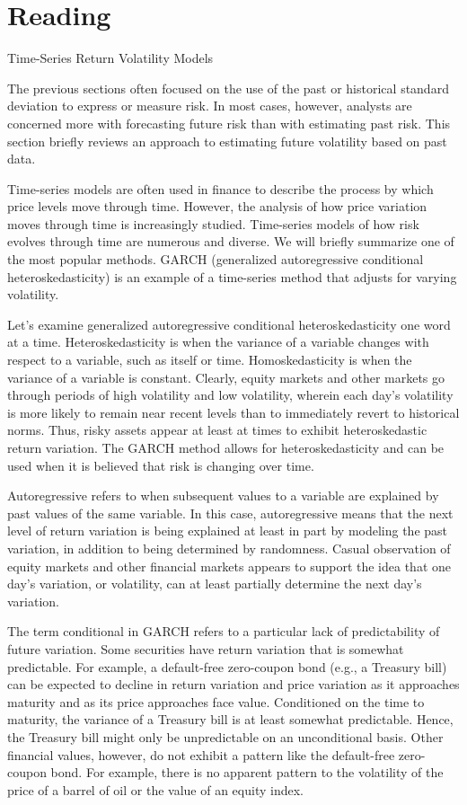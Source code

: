 \documentclass[11pt]{article}
\begin{document}
\section*{Reading}
Time-Series Return Volatility Models

The previous sections often focused on the use of the past or historical standard deviation to express or measure risk. In most cases, however, analysts are concerned more with forecasting future risk than with estimating past risk. This section briefly reviews an approach to estimating future volatility based on past data.

Time-series models are often used in finance to describe the process by which price levels move through time. However, the analysis of how price variation moves through time is increasingly studied. Time-series models of how risk evolves through time are numerous and diverse. We will briefly summarize one of the most popular methods. GARCH (generalized autoregressive conditional heteroskedasticity) is an example of a time-series method that adjusts for varying volatility.

Let's examine generalized autoregressive conditional heteroskedasticity one word at a time. Heteroskedasticity is when the variance of a variable changes with respect to a variable, such as itself or time. Homoskedasticity is when the variance of a variable is constant. Clearly, equity markets and other markets go through periods of high volatility and low volatility, wherein each day's volatility is more likely to remain near recent levels than to immediately revert to historical norms. Thus, risky assets appear at least at times to exhibit heteroskedastic return variation. The GARCH method allows for heteroskedasticity and can be used when it is believed that risk is changing over time.

Autoregressive refers to when subsequent values to a variable are explained by past values of the same variable. In this case, autoregressive means that the next level of return variation is being explained at least in part by modeling the past variation, in addition to being determined by randomness. Casual observation of equity markets and other financial markets appears to support the idea that one day's variation, or volatility, can at least partially determine the next day's variation.

The term conditional in GARCH refers to a particular lack of predictability of future variation. Some securities have return variation that is somewhat predictable. For example, a default-free zero-coupon bond (e.g., a Treasury bill) can be expected to decline in return variation and price variation as it approaches maturity and as its price approaches face value. Conditioned on the time to maturity, the variance of a Treasury bill is at least somewhat predictable. Hence, the Treasury bill might only be unpredictable on an unconditional basis. Other financial values, however, do not exhibit a pattern like the default-free zero-coupon bond. For example, there is no apparent pattern to the volatility of the price of a barrel of oil or the value of an equity index.
\end{document}
